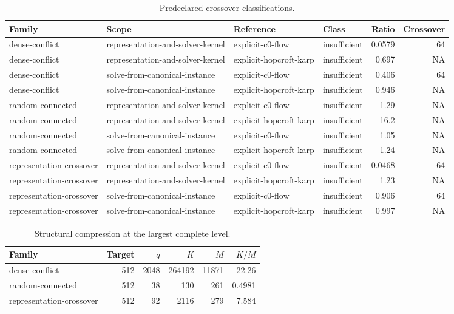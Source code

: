 \begin{table}[t]
\caption{Predeclared crossover classifications.}
\label{tab:kernel-crossover}
\begin{tabular}{llllrr}
\toprule
Family & Scope & Reference & Class & Ratio & Crossover \\
\midrule
dense-conflict & representation-and-solver-kernel & explicit-c0-flow & insufficient & 0.0579 & 64 \\
dense-conflict & representation-and-solver-kernel & explicit-hopcroft-karp & insufficient & 0.697 & NA \\
dense-conflict & solve-from-canonical-instance & explicit-c0-flow & insufficient & 0.406 & 64 \\
dense-conflict & solve-from-canonical-instance & explicit-hopcroft-karp & insufficient & 0.946 & NA \\
random-connected & representation-and-solver-kernel & explicit-c0-flow & insufficient & 1.29 & NA \\
random-connected & representation-and-solver-kernel & explicit-hopcroft-karp & insufficient & 16.2 & NA \\
random-connected & solve-from-canonical-instance & explicit-c0-flow & insufficient & 1.05 & NA \\
random-connected & solve-from-canonical-instance & explicit-hopcroft-karp & insufficient & 1.24 & NA \\
representation-crossover & representation-and-solver-kernel & explicit-c0-flow & insufficient & 0.0468 & 64 \\
representation-crossover & representation-and-solver-kernel & explicit-hopcroft-karp & insufficient & 1.23 & NA \\
representation-crossover & solve-from-canonical-instance & explicit-c0-flow & insufficient & 0.906 & 64 \\
representation-crossover & solve-from-canonical-instance & explicit-hopcroft-karp & insufficient & 0.997 & NA \\
\bottomrule
\end{tabular}
\end{table}

\begin{table}[t]
\caption{Structural compression at the largest complete level.}
\label{tab:kernel-compression}
\begin{tabular}{lrrrrr}
\toprule
Family & Target & $q$ & $K$ & $M$ & $K/M$ \\
\midrule
dense-conflict & 512 & 2048 & 264192 & 11871 & 22.26 \\
random-connected & 512 & 38 & 130 & 261 & 0.4981 \\
representation-crossover & 512 & 92 & 2116 & 279 & 7.584 \\
\bottomrule
\end{tabular}
\end{table}

